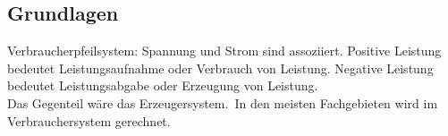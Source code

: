 \documentclass[fs, footer]{latex4ei}
\begin{document}
\titlespacing*{\subsubsection} {0pt}{0.5ex}{2.0ex}
\titlespacing*{\subsection} {0pt}{0.5ex}{2.0ex}

\vspace{-4mm}
\begin{multicols*}{4}

\section{Grundlagen}



Verbraucherpfeilsystem: Spannung und Strom sind assoziiert. Positive Leistung bedeutet Leistungsaufnahme oder Verbrauch von Leistung.
Negative Leistung bedeutet Leistungsabgabe oder Erzeugung von Leistung.\\
Das Gegenteil wäre das Erzeugersystem.\
In den meisten Fachgebieten wird im Verbrauchersystem gerechnet.


\end{multicols*}
\end{document}
